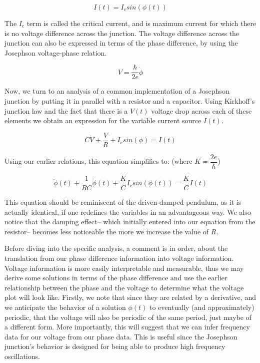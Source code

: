 \documentclass[12pt]{article}
\begin{document}
\begin{equation}
I(t) = I_c sin(\phi(t))
\end{equation}

The $I_c$ term is called the critical current, and is maximum current for which there is no voltage difference across the junction.  The voltage difference across the junction can also be expressed in terms of the phase difference, by using the Josephson voltage-phase relation.

\begin{equation}
V = \dfrac{\hbar}{2e} \dot{\phi}
\end{equation}

Now, we turn to an analysis of a common implementation of a Josephson junction by putting it in parallel with a resistor and a capacitor.  Using Kirkhoff's junction law and the fact that there is a $V(t)$ voltage drop across each of these elements we obtain an expression for the variable current source $I(t)$.

\begin{equation}
C \dot{V} +\dfrac{V}{R} + I_c sin(\phi) = I(t)
\end{equation}

Using our earlier relations, this equation simplifies to:  (where $K = \dfrac{2e}{\hbar} $)

\begin{equation}
\ddot{\phi}(t) + \dfrac{1}{RC} \dot{\phi}(t) + \dfrac{K}{C} I_c sin(\phi(t)) = \dfrac{K}{C} I(t)
\end{equation}

This equation should be reminiscent of the driven-damped pendulum, as it is actually identical, if one redefines the variables in an advantageous way.  We also notice that the damping effect-- which initially entered into our equation from the resistor-- becomes less noticeable the more we increase the value of $R$.

Before diving into the specific analysis, a comment is in order, about the translation from our phase difference information into voltage information.  Voltage information is more easily interpretable and measurable, thus we may derive some solutions in terms of the phase difference and use the earlier relationship between the phase and the voltage to determine what the voltage plot will look like.  Firstly, we note that since they are related by a derivative, and we anticipate the behavior of a solution $\phi(t)$ to eventually (and approximately) periodic, that the voltage will also be periodic of the same period, just maybe of a different form.  More importantly, this will suggest that we can infer frequency data for our voltage from our phase data.  This is useful since the Josephson junction's behavior is designed for being able to produce high frequency oscillations.
\end{document}

